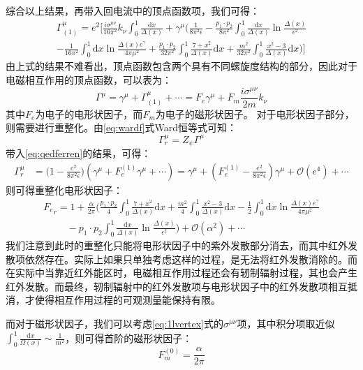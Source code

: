 综合以上结果，再带入回电流中的顶点函数项，我们可得：
\begin{multline}
\Gamma_{(1)}^\mu=e^2\Big[ \frac{i\sigma^{\mu\nu}}{16\pi^2}k_\nu\int_0^1\frac{\mathrm{d}x}{\Delta(x)}+\gamma^\mu\Big(\frac{1}{8\pi^2\epsilon}-\frac{p_1\cdot p_2}{8\pi^2}\int_0^1\frac{\mathrm{d}x}{\Delta(x)}\ln\frac{\Delta(x)}{\epsilon^2}\\
-\frac{1}{16\pi^2}\int_0^1\mathrm{d}x\ln\frac{\Delta(x)e^\gamma}{4\pi\mu^2}+\frac{p_1\cdot p_2}{32\pi^2}\int_0^1\frac{7+x^2}{\Delta(x)}\mathrm{d}x+\frac{m^2}{32\pi^2}\int_0^1\frac{x^2-3}{\Delta(x)}\mathrm{d}x\Big)
\Big]\label{eq:1lvertex}
\end{multline}
由上式的结果不难看出，顶点函数包含两个具有不同螺旋度结构的部分，因此对于电磁相互作用的顶点函数，可以表为：
\begin{equation}
    \Gamma^\mu=\gamma^\mu+\Gamma_{(1)}^\mu+\cdots=F_e\gamma^\mu+F_m\frac{i\sigma^{\mu\nu}}{2m}k_\nu
\end{equation}
其中$F_e$为电子的电形状因子，而$F_m$为电子的磁形状因子。
对于电形状因子部分，则需要进行重整化。由\eqref{eq:wardf}式Ward恒等式可知：
\begin{equation}
    \Gamma^\mu_r=Z_\psi\Gamma^\mu
\end{equation}
带入\eqref{eq:qedferren}的结果，可得：
\begin{align}
        \Gamma^\mu_r&=\Big(1-\frac{e^2}{8\pi^2\epsilon}\Big)(\gamma^\mu+F^{(1)}_e\gamma^\mu+\cdots)=\gamma^\mu+(F^{(1)}_e-\frac{e^2}{8\pi^2\epsilon})\gamma^\mu+\mathcal{O}(e^4)+\cdots
\end{align}
则可得重整化电形状因子：
\begin{multline}
            {F_e}_r=1+\frac{\alpha}{2\pi}\Big(\frac{p_1\cdot p_2}{4}\int_0^1\frac{7+x^2}{\Delta(x)}\mathrm{d}x+\frac{m^2}{4}\int_0^1\frac{x^2-3}{\Delta(x)}\mathrm{d}x-\frac{1}{2}\int_0^1\mathrm{d}x\ln\frac{\Delta(x)e^\gamma}{4\pi\mu^2}\\\hspace{1cm}-{p_1\cdot p_2}\int_0^1\frac{\mathrm{d}x}{\Delta(x)}\ln\frac{\Delta(x)}{\epsilon^2}\Big)+\mathcal{O}(\alpha^2)+\cdots
\end{multline}
我们注意到此时的重整化只能将电形状因子中的紫外发散部分消去，而其中红外发散项依然存在。实际上如果只单独考虑这样的过程，是无法将红外发散消除的。而在实际中当靠近红外能区时，电磁相互作用过程还会有轫制辐射过程，其也会产生红外发散。而最终，轫制辐射中的红外发散项与电形状因子中的红外发散项相互抵消，才使得相互作用过程的可观测量能保持有限。

而对于磁形状因子，我们可以考虑\eqref{eq:1lvertex}式的$\sigma^{\mu\nu}$项，其中积分项取近似$\int_0^1\frac{\mathrm{d}x}{\Omega(x)}\sim\frac{1}{m^2}$，则可得首阶的磁形状因子：
\begin{equation}
    F^{(0)}_m=\frac{\alpha}{2\pi}
\end{equation}

